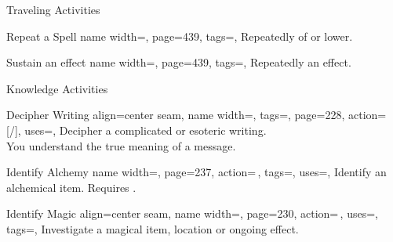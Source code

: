 \begin{PageFrontLandscape}
\begin{TablesHalf}{\frontTableHeight}
\begin{Table}{Traveling Activities}
\begin{entry}{Repeat a Spell}{%
                name width=\activityLength,%
                page=439,
                tags=\Concentrate,
            }
                Repeatedly  of or lower.\hfill
            \end{entry}
            \begin{entry}{Sustain an effect}{%
                name width=\activityLength,%
                page=439,
                tags=\Concentrate,
            }
                Repeatedly  an effect. \hfill
            \end{entry}
        \end{Table}
        \TableSpace
        \begin{Table}{Knowledge Activities}
            \begin{entry}{Decipher Writing}{%
                align=center seam,
                name width=\activityLength,%
                tags=\Concentrate,
                page=228,
                action=\,[/],
                uses={\VariousKnowledge[tags={T,S}]},
            }
                Decipher a complicated or esoteric writing. \hfill
                \\
                You understand the true meaning of a   message. \hfill
            \end{entry}
            \begin{entry}{Identify Alchemy}{%
                name width=\activityLength,%
                page=237,
                action=\,,
                tags=\Concentrate,
                uses={\Crafting[tags={T,S}]},
            }
                Identify an alchemical item. Requires .\hfill
            \end{entry}
            \begin{entry}{Identify Magic}{%
                align=center seam,
                name width=\activityLength,%
                page=230,
                action=\,,
                uses={\MagicalSkill[tags={T,S}]},
                tags=\Concentrate,
            }
                Investigate a magical item, location or ongoing effect.\hfill
                \quad
                \\

\end{entry}
\end{Table}
\end{TablesHalf}
\end{PageFrontLandscape}
